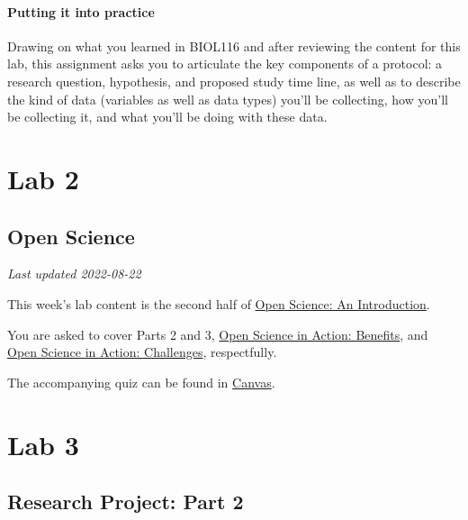 \documentclass[
]{book}
\begin{document}
\hypertarget{putting-it-into-practice}{%
\subsection*{Putting it into practice}\label{putting-it-into-practice}}

Drawing on what you learned in BIOL116 and after reviewing the content for this lab, this assignment asks you to articulate the key components of a protocol: a research question, hypothesis, and proposed study time line, as well as to describe the kind of data (variables as well as data types) you'll be collecting, how you'll be collecting it, and what you'll be doing with these data.

\hypertarget{part-lab-2}{%
\part*{Lab 2}\label{part-lab-2}}

\hypertarget{open-science}{%
\chapter*{Open Science}\label{open-science}}

\emph{Last updated 2022-08-22}

This week's lab content is the second half of \href{https://ubco-biology.github.io/OS-Introduction/}{Open Science: An Introduction}.

You are asked to cover Parts 2 and 3, \href{https://ubco-biology.github.io/OS-Introduction/open-science-in-action-benefits.html}{Open Science in Action: Benefits}, and \href{https://ubco-biology.github.io/OS-Introduction/open-science-in-action-challenges.html}{Open Science in Action: Challenges}, respectfully.

The accompanying quiz can be found in \href{https://canvas.ubc.ca/courses/94573}{Canvas}.

\hypertarget{part-lab-3}{%
\part*{Lab 3}\label{part-lab-3}}

\hypertarget{research-project-part-2}{%
\chapter*{Research Project: Part 2}\label{research-project-part-2}}
\end{document}
